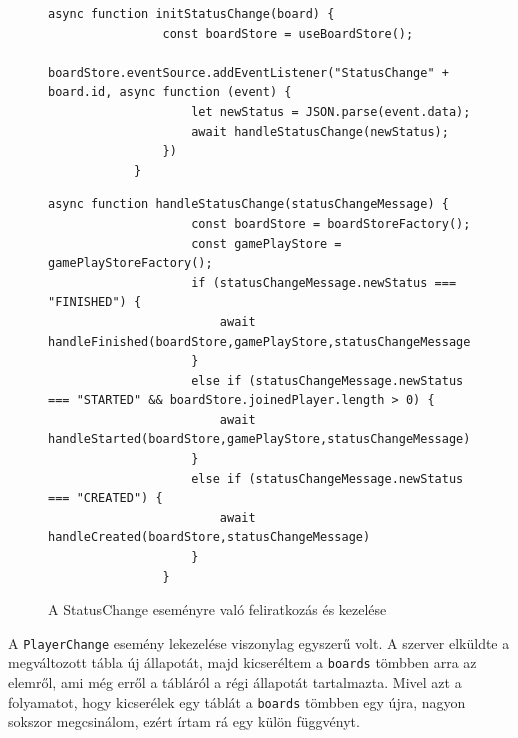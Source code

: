 \documentclass[a4paper,twoside]{article}
\begin{document}
\begin{figure}
	\caption{A StatusChange eseményre való feliratkozás és kezelése}
		\begin{minipage}{\textwidth}
			\begin{lstlisting}[style=javascriptStyle]
			async function initStatusChange(board) {
				const boardStore = useBoardStore();
				boardStore.eventSource.addEventListener("StatusChange" + board.id, async function (event) {
					let newStatus = JSON.parse(event.data);
					await handleStatusChange(newStatus);
				})
			}
			\end{lstlisting}
		\end{minipage}
		\begin{minipage}{\textwidth}
			\begin{lstlisting}[style=javascriptStyle]
				async function handleStatusChange(statusChangeMessage) {
					const boardStore = boardStoreFactory();
					const gamePlayStore = gamePlayStoreFactory();
					if (statusChangeMessage.newStatus === "FINISHED") {
						await handleFinished(boardStore,gamePlayStore,statusChangeMessage);
					}
					else if (statusChangeMessage.newStatus === "STARTED" && boardStore.joinedPlayer.length > 0) {
						await handleStarted(boardStore,gamePlayStore,statusChangeMessage)
					}
					else if (statusChangeMessage.newStatus === "CREATED") {
						await handleCreated(boardStore,statusChangeMessage)
					}
				}
			\end{lstlisting}
		\end{minipage}
	\label{statuschange}
\end{figure}

A \verb|PlayerChange| esemény lekezelése viszonylag egyszerű volt. A szerver elküldte a megváltozott tábla új állapotát, majd kicseréltem a \verb|boards| tömbben arra az elemről, ami még erről a tábláról a régi állapotát tartalmazta. Mivel azt a folyamatot, hogy kicserélek egy táblát a \verb|boards| tömbben egy újra, nagyon sokszor megcsinálom, ezért írtam rá egy külön függvényt. 
\end{document}
